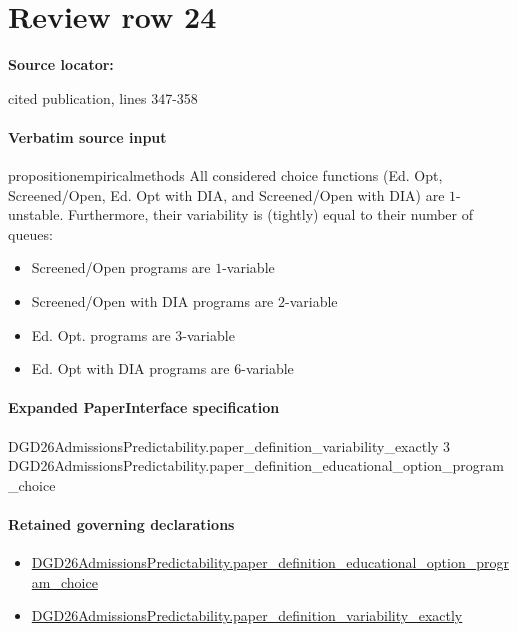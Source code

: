 \documentclass[10pt]{article}
\begin{document}
\section*{Review row 24}
\textbf{Source locator:} {\footnotesize\raggedright cited publication, lines 347-\allowbreak{}358\par}
\paragraph{Verbatim source input}
\begin{ReviewVerbatim}
\begin{restatable}[]{proposition}{empiricalmethods}
\label{prop:program-variability}
All considered choice functions ({Ed. Opt}, {Screened/Open}, {Ed. Opt with DIA}, and {Screened/Open with DIA}) are $1$-unstable. Furthermore, their variability is (tightly) equal to their number of queues:

\begin{itemize}[noitemsep,topsep=0pt,parsep=0pt,partopsep=0pt]
    \item Screened/Open programs are $1$-variable
    \item Screened/Open with DIA programs are $2$-variable
    \item Ed. Opt. programs are $3$-variable
    \item Ed. Opt with DIA programs are $6$-variable
\end{itemize}

\end{restatable}
\end{ReviewVerbatim}



\paragraph{Expanded PaperInterface specification}
\begin{ReviewVerbatim}
DGD26AdmissionsPredictability.paper_definition_variability_exactly 3
  DGD26AdmissionsPredictability.paper_definition_educational_option_program_choice
\end{ReviewVerbatim}

\paragraph{Retained governing declarations}
\begin{itemize}\raggedright
\item \hyperlink{governing-declaration-7e703b7870b50054}{DGD26\allowbreak{}Admissions\allowbreak{}Predictability.\allowbreak{}paper\_\allowbreak{}definition\_\allowbreak{}educational\_\allowbreak{}option\_\allowbreak{}program\_\allowbreak{}choice}
\item \hyperlink{governing-declaration-ce6697be3f1c2256}{DGD26\allowbreak{}Admissions\allowbreak{}Predictability.\allowbreak{}paper\_\allowbreak{}definition\_\allowbreak{}variability\_\allowbreak{}exactly}
\end{itemize}
\end{document}
